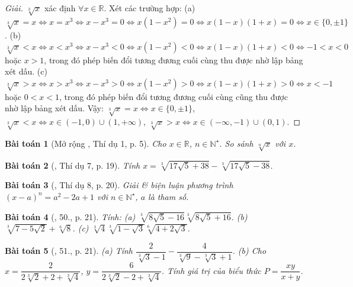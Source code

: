 \documentclass{article}
\newtheorem{baitoan}{Bài toán}
\begin{document}
\begin{proof}[Giải]
	$\sqrt[3]{x}$ xác định $\forall x\in\mathbb{R}$. Xét các trường hợp: (a) $\sqrt[3]{x} = x\Leftrightarrow x = x^3\Leftrightarrow x - x^3 = 0\Leftrightarrow x(1 - x^2) = 0\Leftrightarrow x(1 - x)(1 + x) = 0\Leftrightarrow x\in\{0,\pm1\}$. (b) $\sqrt[3]{x} < x\Leftrightarrow x < x^3\Leftrightarrow x - x^3 < 0\Leftrightarrow x(1 - x^2) < 0\Leftrightarrow x(1 - x)(1 + x) < 0\Leftrightarrow -1 < x < 0$ hoặc $x > 1$, trong đó phép biến đổi tương đương cuối cùng thu được nhờ lập bảng xét dấu. (c) $\sqrt[3]{x} > x\Leftrightarrow x > x^3\Leftrightarrow x - x^3 > 0\Leftrightarrow x(1 - x^2) > 0\Leftrightarrow x(1 - x)(1 + x) > 0\Leftrightarrow x < -1$ hoặc $0 < x < 1$, trong đó phép biến đổi tương đương cuối cùng cũng thu được nhờ lập bảng xét dấu. Vậy: $\sqrt[3]{x} = x\Leftrightarrow x\in\{0,\pm1\}$, $\sqrt[3]{x} < x\Leftrightarrow x\in(-1,0)\cup(1,+\infty)$, $\sqrt[3]{x} > x\Leftrightarrow x\in(-\infty,-1)\cup(0,1)$.
\end{proof}

\begin{baitoan}[Mở rộng \cite{Tuyen_Toan_9}, Thí dụ 1, p. 5]
	Cho $x\in\mathbb{R}$, $n\in\mathbb{N}^\star$. So sánh $\sqrt[n]{x}$ với $x$.
\end{baitoan}

\begin{baitoan}[\cite{Tuyen_Toan_9}, Thí dụ 7, p. 19]
	Tính $x = \sqrt[3]{17\sqrt{5} + 38} - \sqrt[3]{17\sqrt{5} - 38}$.
\end{baitoan}

\begin{baitoan}[\cite{Tuyen_Toan_9}, Thí dụ 8, p. 20]
	Giải \& biện luận phương trình $(x - a)^n = a^2 - 2a + 1$ với $n\in\mathbb{N}^\star$, $a$ là tham số.
\end{baitoan}

\begin{baitoan}[\cite{Tuyen_Toan_9}, 50., p. 21]
	Tính: (a) $\sqrt[3]{8\sqrt{5} - 16}\sqrt[3]{8\sqrt{5} + 16}$. (b) $\sqrt[3]{7 - 5\sqrt{2}} + \sqrt[6]{8}$. (c) $\sqrt[3]{4}\sqrt[3]{1 - \sqrt{3}}\sqrt[6]{4 + 2\sqrt{3}}$.
\end{baitoan}

\begin{baitoan}[\cite{Tuyen_Toan_9}, 51., p. 21]
	(a) Tính $\dfrac{2}{\sqrt[3]{3} - 1} - \dfrac{4}{\sqrt[3]{9} - \sqrt[3]{3} + 1}$. (b) Cho $x = \dfrac{2}{2\sqrt[3]{2} + 2 + \sqrt[3]{4}}$, $y = \dfrac{6}{2\sqrt[3]{2} - 2 + \sqrt[3]{4}}$. Tính giá trị của biểu thức $P = \dfrac{xy}{x + y}$.
\end{baitoan}
\end{document}
